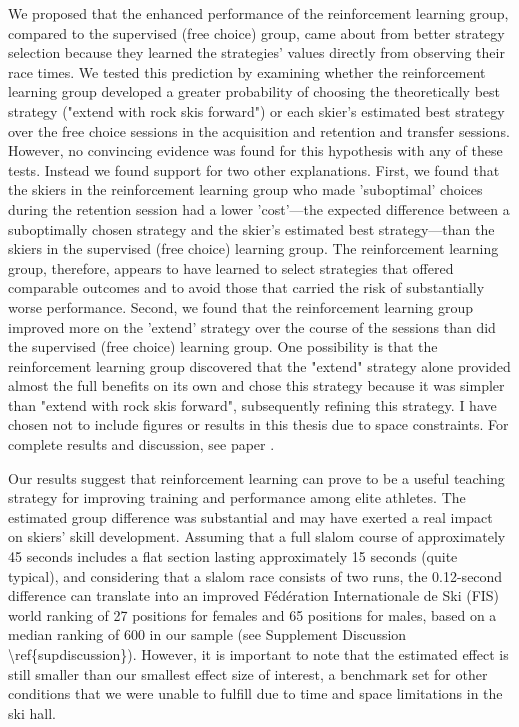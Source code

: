 We proposed that the enhanced performance of the reinforcement learning group, compared to the supervised (free choice) group, came about from better strategy selection because they learned the strategies' values directly from observing their race times. We tested this prediction by examining whether the reinforcement learning group developed a greater probability of choosing the theoretically best strategy ("extend with rock skis forward") or each skier's estimated best strategy over the free choice sessions in the acquisition and retention and transfer sessions. However, no convincing evidence was found for this hypothesis with any of these tests. Instead we found support for two other explanations. First, we found that the skiers in the reinforcement learning group who made 'suboptimal' choices during the retention session had a lower 'cost'—the expected difference between a suboptimally chosen strategy and the skier's estimated best strategy—than the skiers in the supervised (free choice) learning group. The reinforcement learning group, therefore, appears to have learned to select strategies that offered comparable outcomes and to avoid those that carried the risk of substantially worse performance. Second, we found that the reinforcement learning group improved more on the 'extend' strategy over the course of the sessions than did the supervised (free choice) learning group. One possibility is that the reinforcement learning group discovered that the "extend" strategy alone provided almost the full benefits on its own and chose this strategy because it was simpler than "extend with rock skis forward", subsequently refining this strategy. I have chosen not to include figures or results in this thesis due to space constraints. For complete results and discussion, see paper .

Our results suggest that reinforcement learning can prove to be a useful teaching strategy for improving training and performance among elite athletes. The estimated group difference was substantial and may have exerted a real impact on skiers' skill development. Assuming that a full slalom course of approximately 45 seconds includes a flat section lasting approximately 15 seconds (quite typical), and considering that a slalom race consists of two runs, the 0.12-second difference can translate into an improved Fédération Internationale de Ski (FIS) world ranking of 27 positions for females and 65 positions for males, based on a median ranking of 600 in our sample (see Supplement Discussion \textbackslash{}ref\{supdiscussion\}). However, it is important to note that the estimated effect is still smaller than our smallest effect size of interest, a benchmark set for other conditions that we were unable to fulfill due to time and space limitations in the ski hall. 

